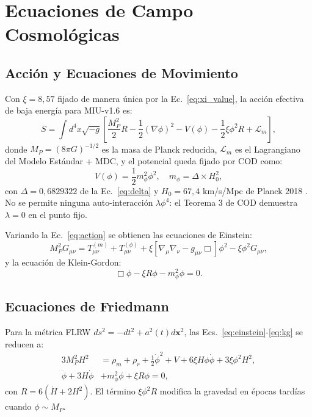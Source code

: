 \documentclass[12pt, a4paper]{article}
\theoremstyle{miuThm}
\theoremstyle{remark}
\begin{document}
\section{Ecuaciones de Campo Cosmológicas}
\label{sec:field}

\subsection{Acción y Ecuaciones de Movimiento}
\label{subsec:action}

Con $\xi = 8{,}57$ fijado de manera única por la Ec.~\eqref{eq:xi_value}, la
acción efectiva de baja energía para MIU-v1.6 es:
\begin{equation}
S = \int d^4x \sqrt{-g} \left[ \frac{M_P^2}{2} R - \frac{1}{2}(\nabla\phi)^2
      - V(\phi) - \frac{1}{2}\xi\phi^2 R + \mathcal{L}_m \right],
\label{eq:action}
\end{equation}
donde $M_P = (8\pi G)^{-1/2}$ es la masa de Planck reducida, $\mathcal{L}_m$ es
el Lagrangiano del Modelo Estándar + MDC, y el potencial queda fijado por COD como:
\begin{equation}
V(\phi) = \frac{1}{2}m_\phi^2 \phi^2, \quad m_\phi = \Delta \times H_0^2,
\label{eq:potential}
\end{equation}
con $\Delta = 0{,}6829322$ de la Ec.~\eqref{eq:delta} y $H_0 = 67{,}4$ km/s/Mpc
de Planck 2018 \cite{Planck2020}. No se permite ninguna auto-interacción
$\lambda\phi^4$: el Teorema 3 de COD demuestra $\lambda = 0$ en el punto fijo.

Variando la Ec.~\eqref{eq:action} se obtienen las ecuaciones de Einstein:
\begin{equation}
M_P^2 G_{\mu\nu} = T_{\mu\nu}^{(m)} + T_{\mu\nu}^{(\phi)} + \xi\left[
\nabla_\mu\nabla_\nu - g_{\mu\nu}\Box \right]\phi^2 - \xi\phi^2 G_{\mu\nu},
\label{eq:einstein}
\end{equation}
y la ecuación de Klein-Gordon:
\begin{equation}
\Box\phi - \xi R \phi - m_\phi^2 \phi = 0.
\label{eq:kg}
\end{equation}

\subsection{Ecuaciones de Friedmann}
Para la métrica FLRW $ds^2 = -dt^2 + a^2(t)d\mathbf{x}^2$, las
Ecs.~\eqref{eq:einstein}-\eqref{eq:kg} se reducen a:
\begin{align}
3M_P^2 H^2 &= \rho_m + \rho_r + \frac{1}{2}\dot{\phi}^2 + V + 6\xi H\phi\dot{\phi}
              + 3\xi\phi^2 H^2, \label{eq:friedmann1} \\
\ddot{\phi} + 3H\dot{\phi} &+ m_\phi^2\phi + \xi R \phi = 0, \label{eq:kg_flrw}
\end{align}
con $R = 6(\dot{H} + 2H^2)$. El término $\xi\phi^2 R$ modifica la gravedad en
épocas tardías cuando $\phi \sim M_P$.
\end{document}
